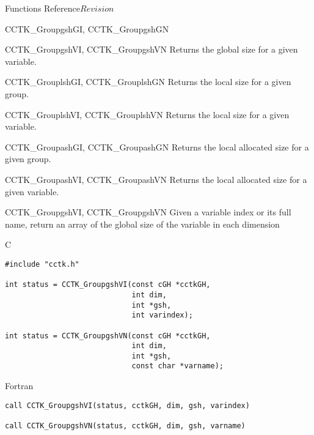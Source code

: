 \begin{cactuspart}{ Functions Reference}{}{$Revision$}
\begin{FunctionDescription}{CCTK\_GroupgshGI, CCTK\_GroupgshGN}
\begin{SeeAlsoSection}
\begin{SeeAlso}{CCTK\_GroupgshVI, CCTK\_GroupgshVN}
Returns the global size for a given variable.
\end{SeeAlso}
\begin{SeeAlso}{CCTK\_GrouplshGI, CCTK\_GrouplshGN}
Returns the local size for a given group.
\end{SeeAlso}
\begin{SeeAlso}{CCTK\_GrouplshVI, CCTK\_GrouplshVN}
Returns the local size for a given variable.
\end{SeeAlso}
\begin{SeeAlso}{CCTK\_GroupashGI, CCTK\_GroupashGN}
Returns the local allocated size for a given group.
\end{SeeAlso}
\begin{SeeAlso}{CCTK\_GroupashVI, CCTK\_GroupashVN}
Returns the local allocated size for a given variable.
\end{SeeAlso}
\end{SeeAlsoSection}
\end{FunctionDescription}


\begin{FunctionDescription}{CCTK\_GroupgshVI, CCTK\_GroupgshVN}
\label{CCTK-GroupgshVI}
\label{CCTK-GroupgshVN}
Given a variable index or its full name, return an array of the global size of the variable in each dimension

\begin{SynopsisSection}
\begin{Synopsis}{C}
\begin{verbatim}
#include "cctk.h"

int status = CCTK_GroupgshVI(const cGH *cctkGH,
                             int dim,
                             int *gsh,
                             int varindex);

int status = CCTK_GroupgshVN(const cGH *cctkGH,
                             int dim,
                             int *gsh,
                             const char *varname);
\end{verbatim}
\end{Synopsis}
\begin{Synopsis}{Fortran}
\begin{verbatim}
call CCTK_GroupgshVI(status, cctkGH, dim, gsh, varindex)

call CCTK_GroupgshVN(status, cctkGH, dim, gsh, varname)


\end{verbatim}
\end{Synopsis}
\end{SynopsisSection}
\end{FunctionDescription}
\end{cactuspart}
